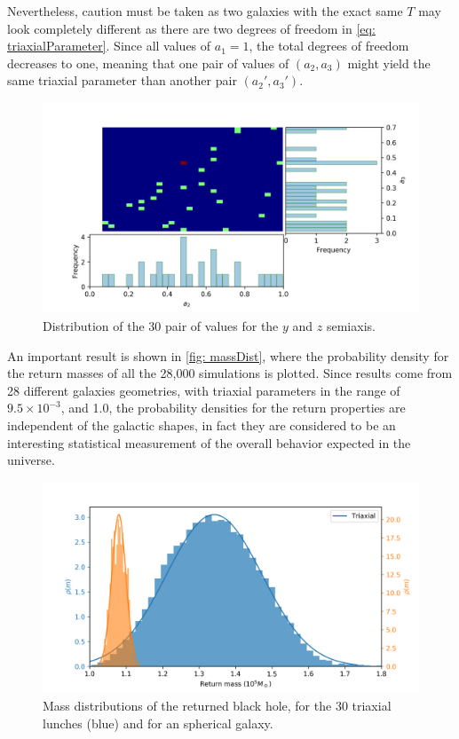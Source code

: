 	Nevertheless, caution must be taken as two galaxies with the exact same $T$ may look completely different as there are two degrees of freedom in \autoref{eq: triaxialParameter}. Since all values of $a_1 = 1$, the total degrees of freedom decreases to one, meaning that one pair of values of $(a_2, a_3)$ might yield the same triaxial parameter than another pair $(a_2', a_3')$.
	
	\begin{figure}[h]
		\centering
		\includegraphics[width = 0.9\linewidth]{"../Files/Week 13/triaxial_axes"}
		\caption{Distribution of the 30 pair of values for the $y$ and $z$ semiaxis.}
		\label{fig: semiaxisDist}
	\end{figure}

	An important result is shown in \autoref{fig: massDist}, where the probability density for the return masses of all the 28,000 simulations is plotted. Since results come from 28 different galaxies geometries, with triaxial parameters in the range of $9.5\times10^{-3}$, and 1.0, the probability densities for the return properties are independent of the galactic shapes, in fact they are considered to be an interesting statistical measurement of the overall behavior expected in the universe.
	\begin{figure}[h]
		\centering
		\includegraphics[width=0.7\linewidth]{"../Files/Week 14/dist_masses"}
		\caption{Mass distributions of the returned black hole, for the 30 triaxial lunches (blue) and for an spherical galaxy.}
		\label{fig: massDist}
	\end{figure}

